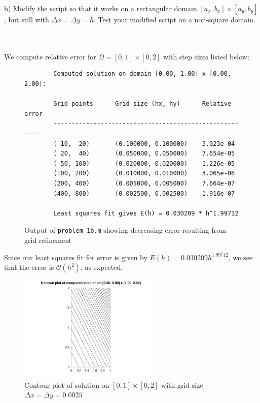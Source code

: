 \pagebreak
b) Modify the script so that it works on a rectangular domain $[a_x, b_x] \times [a_y, b_y]$, but still with
   $\Delta x = \Delta y = h$. Test your modified script on a non-square domain.

\begin{solution}\ \\\\
    We compute relative error for $\Omega = [0, 1] \times [0, 2]$ with step sizes listed below:

    \begin{figure}[h]
        \begin{lstlisting}
        Computed solution on domain [0.00, 1.00] x [0.00, 2.00]: 
 
        Grid points      Grid size (hx, hy)      Relative error
        -------------------------------------------------------
        ( 10,  20)       (0.100000, 0.100000)    3.023e-04 
        ( 20,  40)       (0.050000, 0.050000)    7.654e-05 
        ( 50, 100)       (0.020000, 0.020000)    1.226e-05 
        (100, 200)       (0.010000, 0.010000)    3.065e-06 
        (200, 400)       (0.005000, 0.005000)    7.664e-07 
        (400, 800)       (0.002500, 0.002500)    1.916e-07 
             
        Least squares fit gives E(h) = 0.030209 * h^1.99712
        \end{lstlisting}
        \caption{Output of \texttt{problem\_1b.m} showing decreasing error resulting from grid refinement}
    \end{figure}

    Since our least squares fit for error is given by $E(h) = 0.030209 h^{1.99712}$, we see that the error is 
    $\mathcal{O}(h^2)$, as expected.
    
    \begin{figure}[h]
        \centering
        \includegraphics[width=0.6\textwidth]{poisson_5pt_stencil_0-0_1-2_hx-0.003_hy-0.003.png}
        \caption{Contour plot of solution on $[0, 1] \times [0, 2]$ with grid size $\Delta x = \Delta y = 0.0025$}
    \end{figure}
\end{solution}

